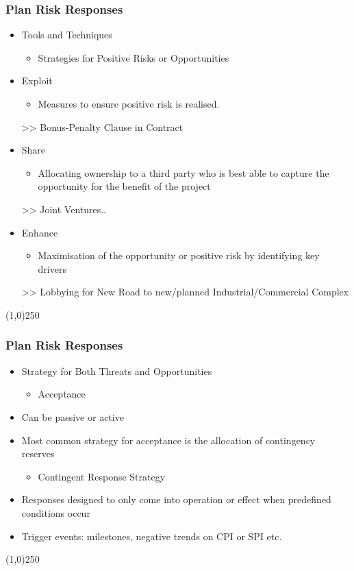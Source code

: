 \begin{frame}
\frametitle{Plan Risk Responses}
\begin{itemize}
\item Tools and Techniques
\begin{itemize}
	\item Strategies for Positive Risks or Opportunities
\end{itemize}
\item Exploit
\begin{itemize}
	\item Measures to ensure positive risk is realised.
\end{itemize}
>> Bonus-Penalty Clause in Contract
\item Share
\begin{itemize}
	\item Allocating ownership to a third party who is best able to capture the opportunity for the benefit of the project
\end{itemize}
>> Joint Ventures..
\item Enhance
\begin{itemize}
	\item Maximisation of the opportunity or positive risk by identifying key drivers
\end{itemize}
>> Lobbying for New Road to new/planned Industrial/Commercial Complex
\end{itemize}
\end{frame}\begin{center}\line(1,0){250}\end{center}




\begin{frame}
\frametitle{Plan Risk Responses}
\begin{itemize}
\item Strategy for Both Threats and Opportunities
\begin{itemize}
	\item Acceptance
\end{itemize}
\item Can be passive or active
\item Most common strategy for acceptance is the allocation of contingency reserves
\begin{itemize}
	\item Contingent Response Strategy
\end{itemize}
\item Responses designed to only come into operation or effect when predefined conditions occur
\item Trigger events: milestones, negative trends on CPI or SPI etc.
\end{itemize}
\end{frame}\begin{center}\line(1,0){250}\end{center}





